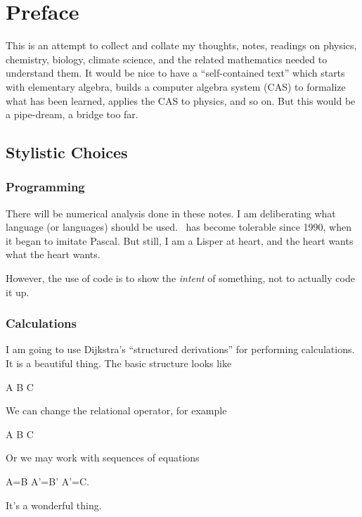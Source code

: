 \chapter*{Preface}

This is an attempt to collect and collate my thoughts, notes, readings
on physics, chemistry, biology, climate science, and the related
mathematics needed to understand them. It would be nice to have a
``self-contained text'' which starts with elementary algebra, builds a
computer algebra system (CAS) to formalize what has been learned,
applies the CAS to physics, and so on. But this would be a pipe-dream, a
bridge too far.

\section*{Stylistic Choices}

\subsection*{Programming} There will be numerical analysis done in these
notes. I am deliberating what language (or languages) should be
used. \FORTRAN\ has become tolerable since 1990, when it began to
imitate Pascal. But still, I am a Lisper at heart, and the heart wants
what the heart wants.

However, the use of code is to show the \emph{intent} of something, not
to actually code it up.


\subsection*{Calculations} I am going to use Dijkstra's ``structured
derivations'' for performing calculations. It is a beautiful thing. The
basic structure looks like
\begin{calculation}
  A
  B
  C
\end{calculation}
We can change the relational operator, for example
\begin{calculation}
  A
  B
  C
\end{calculation}
Or we may work with sequences of equations
\begin{calculation}
  A=B
  A'=B'
  A'=C.
\end{calculation}
It's a wonderful thing.